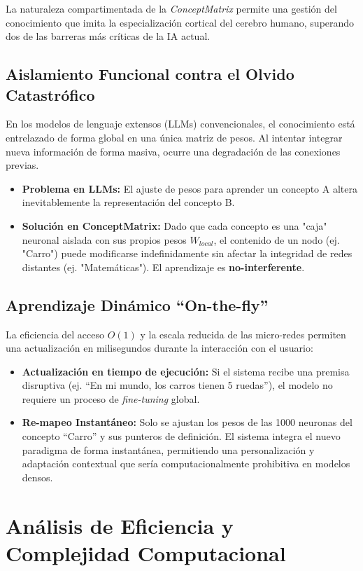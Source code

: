 \documentclass[12pt]{article}
\begin{document}
La naturaleza compartimentada de la \textit{ConceptMatrix} permite una gestión del conocimiento que imita la especialización cortical del cerebro humano, superando dos de las barreras más críticas de la IA actual.

\subsection{Aislamiento Funcional contra el Olvido Catastrófico}
En los modelos de lenguaje extensos (LLMs) convencionales, el conocimiento está entrelazado de forma global en una única matriz de pesos. Al intentar integrar nueva información de forma masiva, ocurre una degradación de las conexiones previas. 
\begin{itemize}
    \item \textbf{Problema en LLMs:} El ajuste de pesos para aprender un concepto A altera inevitablemente la representación del concepto B.
    \item \textbf{Solución en ConceptMatrix:} Dado que cada concepto es una "caja" neuronal aislada con sus propios pesos $W_{local}$, el contenido de un nodo (ej. "Carro") puede modificarse indefinidamente sin afectar la integridad de redes distantes (ej. "Matemáticas"). El aprendizaje es \textbf{no-interferente}.
\end{itemize}

\subsection{Aprendizaje Dinámico ``On-the-fly''}
La eficiencia del acceso $O(1)$ y la escala reducida de las micro-redes permiten una actualización en milisegundos durante la interacción con el usuario:
\begin{itemize}
    \item \textbf{Actualización en tiempo de ejecución:} Si el sistema recibe una premisa disruptiva (ej. ``En mi mundo, los carros tienen 5 ruedas''), el modelo no requiere un proceso de \textit{fine-tuning} global. 
    \item \textbf{Re-mapeo Instantáneo:} Solo se ajustan los pesos de las 1000 neuronas del concepto ``Carro'' y sus punteros de definición. El sistema integra el nuevo paradigma de forma instantánea, permitiendo una personalización y adaptación contextual que sería computacionalmente prohibitiva en modelos densos.
\end{itemize}


\section{Análisis de Eficiencia y Complejidad Computacional}
\end{document}
